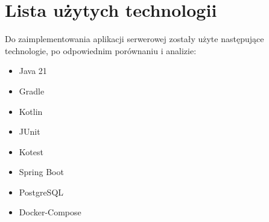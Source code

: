 \section{Lista użytych technologii}
Do zaimplementowania aplikacji serwerowej zostały użyte następujące technologie, po odpowiednim porównaniu i analizie:
\begin{itemize}
    \item Java 21
    \item Gradle
    \item Kotlin
    \item JUnit
    \item Kotest
    \item Spring Boot
    \item PostgreSQL
    \item Docker-Compose
\end{itemize}
